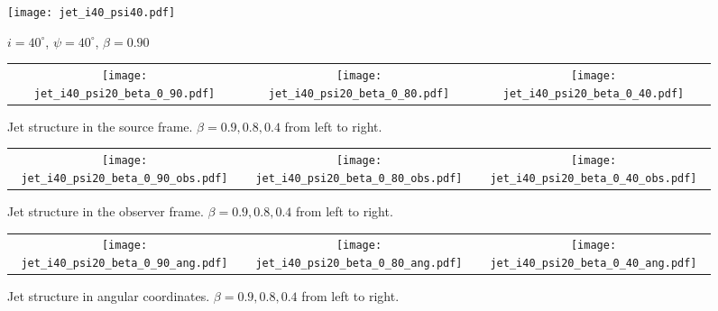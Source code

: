 \documentclass[iop]{emulateapj}
\begin{document}
\begin{figure}
  \begin{center}
    \texttt{[image: jet\_i40\_psi40.pdf]}
  \end{center}
  \caption{$i=40^\circ$, $\psi=40^\circ$, $\beta=0.90$}
\end{figure}

\clearpage

\begin{figure*}
\begin{center}
  \begin{tabular}{ccc}
    \texttt{[image: jet\_i40\_psi20\_beta\_0\_90.pdf]} &
    \texttt{[image: jet\_i40\_psi20\_beta\_0\_80.pdf]} &
    \texttt{[image: jet\_i40\_psi20\_beta\_0\_40.pdf]}
  \end{tabular}
\end{center}
\caption{Jet structure in the source frame. $\beta=0.9, 0.8, 0.4$ from left to right.}
\label{fig:srcframe}
\end{figure*}

\begin{figure*}
\begin{center}
  \begin{tabular}{ccc}
    \texttt{[image: jet\_i40\_psi20\_beta\_0\_90\_obs.pdf]} &
    \texttt{[image: jet\_i40\_psi20\_beta\_0\_80\_obs.pdf]} &
    \texttt{[image: jet\_i40\_psi20\_beta\_0\_40\_obs.pdf]}
  \end{tabular}
\end{center}
\caption{Jet structure in the observer frame. $\beta=0.9, 0.8, 0.4$ from left to right.}
\label{fig:obsframe}
\end{figure*}

\begin{figure*}
\begin{center}
  \begin{tabular}{ccc}
    \texttt{[image: jet\_i40\_psi20\_beta\_0\_90\_ang.pdf]} &
    \texttt{[image: jet\_i40\_psi20\_beta\_0\_80\_ang.pdf]} &
    \texttt{[image: jet\_i40\_psi20\_beta\_0\_40\_ang.pdf]}
  \end{tabular}
\end{center}
\caption{Jet structure in angular coordinates. $\beta=0.9, 0.8, 0.4$ from left to right.}
\label{fig:ang}
\end{figure*}


\end{document}
